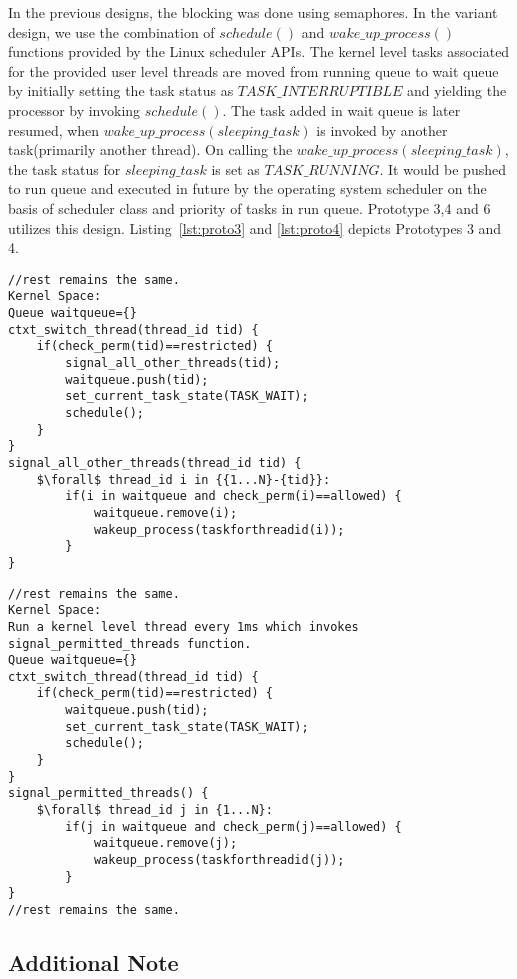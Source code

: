 In the previous designs, the blocking was done using semaphores. 
In the variant design, we use the combination of $schedule()$ and $wake\_up\_process()$ functions provided by the Linux scheduler APIs. 
The kernel level tasks associated for the provided user level threads are moved from running queue to wait queue by initially setting the task status as $TASK\_INTERRUPTIBLE$ and yielding the processor by invoking $schedule()$. 
The task added in wait queue is later resumed, when $wake\_up\_process(sleeping\_task)$ is invoked by another task(primarily another thread). 
On calling the $wake\_up\_process(sleeping\_task)$, the task status for $sleeping\_task$ is set as $TASK\_RUNNING$. 
It would be pushed to run queue and executed in future by the operating system scheduler on the basis of scheduler class and priority of tasks in run queue. 
Prototype 3,4 and 6 utilizes this design.
Listing~\ref{lst:proto3} and \ref{lst:proto4} depicts Prototypes 3 and 4.  
\newpage
\begin{lstlisting}[mathescape=true,caption={Pseudo Code for Prototype 3}, style=customc,frame=tlrb,label={lst:proto3}]
//rest remains the same.
Kernel Space:
Queue waitqueue={}
ctxt_switch_thread(thread_id tid) {	
	if(check_perm(tid)==restricted) {
		signal_all_other_threads(tid);
		waitqueue.push(tid);
		set_current_task_state(TASK_WAIT);
		schedule();
	}
}
signal_all_other_threads(thread_id tid) {
	$\forall$ thread_id i in {{1...N}-{tid}}:
		if(i in waitqueue and check_perm(i)==allowed) {
			waitqueue.remove(i);
			wakeup_process(taskforthreadid(i));
		}
}
\end{lstlisting} 
\begin{lstlisting}[mathescape=true,caption={Pseudo Code for Prototype 4}, style=customc,frame=tlrb,label={lst:proto4}]
//rest remains the same.
Kernel Space:
Run a kernel level thread every 1ms which invokes signal_permitted_threads function.
Queue waitqueue={}
ctxt_switch_thread(thread_id tid) {	
	if(check_perm(tid)==restricted) {	
		waitqueue.push(tid);
		set_current_task_state(TASK_WAIT);
		schedule();
	}
}
signal_permitted_threads() {
	$\forall$ thread_id j in {1...N}:
		if(j in waitqueue and check_perm(j)==allowed) {
			waitqueue.remove(j);
			wakeup_process(taskforthreadid(j));
		}
}
//rest remains the same.
\end{lstlisting}

\subsection*{Additional Note}

